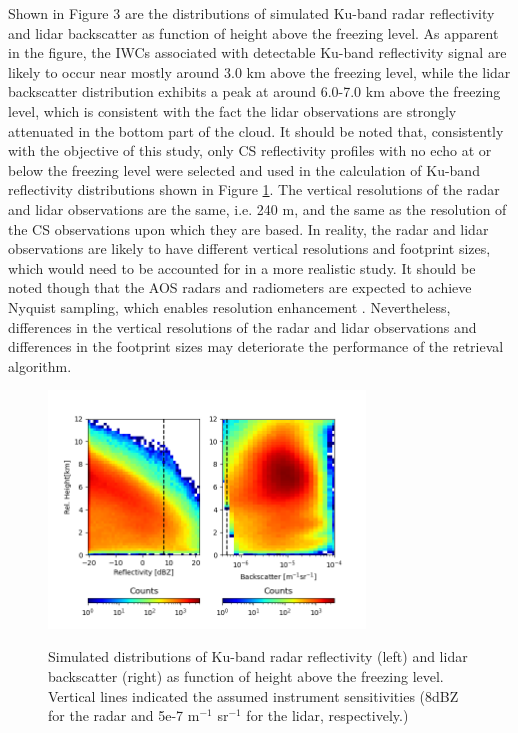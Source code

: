 \documentclass{ametsocV6.1}
\begin{document}
Shown in Figure 3 are the distributions of simulated Ku-band radar reflectivity and 
lidar backscatter as function of height above the freezing level.
As apparent in the figure, the IWCs associated with detectable Ku-band reflectivity
signal are likely to
occur near mostly around 3.0 km above the freezing level, while the lidar backscatter
distribution exhibits a peak at around 6.0-7.0 km
above the freezing level, which is consistent with the fact the lidar observations
are strongly attenuated in the bottom part of the cloud.  It should be noted that, consistently with the objective of
 this study, only CS reflectivity profiles with no echo at or below the freezing level were selected
and used in the calculation of Ku-band reflectivity distributions shown in Figure \ref{f3}.
The vertical resolutions of
the radar and lidar observations are the same, i.e. 240 m, and the same as the resolution of the
CS observations upon which they are based. In reality, the radar and lidar observations are likely to have
different vertical resolutions and footprint sizes, which would need to be accounted for in a more 
realistic study.  It should be noted though that the AOS radars and radiometers are expected to achieve
Nyquist sampling, which enables resolution enhancement \citep{early2001image}.  Nevertheless, differences
in the vertical resolutions of the radar and lidar observations and differences in the footprint sizes
may deteriorate the performance of the retrieval algorithm.

\begin{figure}[t]
    \centering
    \includegraphics[width=0.75\textwidth,angle=0]{fig03.rev.png}\\
    \caption{Simulated distributions of Ku-band radar reflectivity (left) and lidar backscatter (right)
    as function of height above 
    the freezing level. Vertical lines indicated the assumed instrument sensitivities (8dBZ for the 
    radar and 5e-7 m$^{-1}$ sr$^{-1}$ for the lidar, respectively.) }\label{f3}
\end{figure}
\end{document}
